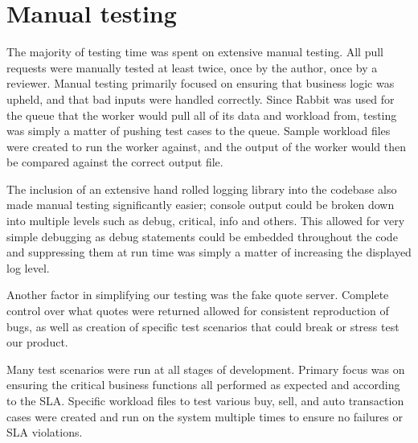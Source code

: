 \section{Manual testing}
The majority of testing time was spent on extensive manual testing.  All pull requests were manually tested at least twice, once by the author, once by a reviewer.  Manual testing primarily focused on ensuring that business logic was upheld, and that bad inputs were handled correctly.  Since Rabbit was used for the queue that the worker would pull all of its data and workload from, testing was simply a matter of pushing test cases to the queue.  Sample workload files were created to run the worker against, and the output of the worker would then be compared against the correct output file.

The inclusion of an extensive hand rolled logging library into the codebase also made manual testing significantly easier; console output could be broken down into multiple levels such as debug, critical, info and others.  This allowed for very simple debugging as debug statements could be embedded throughout the code and suppressing them at run time was simply a matter of increasing the displayed log level.

Another factor in simplifying our testing was the fake quote server.  Complete control over what quotes were returned allowed for consistent reproduction of bugs, as well as creation of specific test scenarios that could break or stress test our product.

Many test scenarios were run at all stages of development.  Primary focus was on ensuring the critical business functions all performed as expected and according to the SLA.  Specific workload files to test various buy, sell, and auto transaction cases were created and run on the system multiple times to ensure no failures or SLA violations.